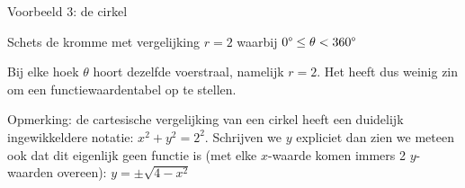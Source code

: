 Voorbeeld 3: de cirkel

Schets de kromme met vergelijking $r=2$ waarbij $0\text{\textdegree}\leq\theta<360\text{\textdegree}$

Bij elke hoek $\theta$ hoort dezelfde voerstraal, namelijk $r=2$.
Het heeft dus weinig zin om een functiewaardentabel op te stellen.

Opmerking: de cartesische vergelijking van een cirkel heeft een duidelijk
ingewikkeldere notatie: $x^{2}+y^{2}=2^{2}$. Schrijven we $y$ expliciet
dan zien we meteen ook dat dit eigenlijk geen functie is (met elke
$x$-waarde komen immers 2 $y$-waarden overeen): $y=\pm\sqrt{4-x^{2}}$

